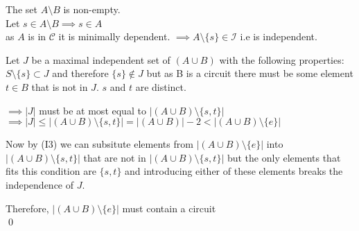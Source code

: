 \documentclass{article}
\theoremstyle{plain}
\theoremstyle{definition}
\theoremstyle{remark}
\begin{document}
\noindent The set $ A \setminus B $ is non-empty.\\
 Let $ s \in A \setminus B    \implies s \in A$\\
 \noindent as $A$ is in $\mathcal{C}$ it is minimally dependent.
 \noindent $\implies A \setminus \{s\} \in \mathcal{I}$ i.e is independent.
 
 \vspace{2mm}
 
\noindent Let $J$ be a maximal independent set of $(A \cup B)$ with the following properties: $S \setminus \{s\} \subset J $ and therefore $ \{s\} \notin J $ but as B is a circuit there must be some element $t \in B$ that is not in $J$. $s$ and $t$ are distinct.
 
 \vspace{2mm}
 
\noindent $\implies |J| $ must be at most equal to $|(A \cup B) \setminus \{s,t\}| $\\
 $\implies |J| \leq |(A \cup B) \setminus \{s,t\}| = |(A \cup B)| - 2 < |(A \cup B) \setminus \{e\}|$
 
 \vspace{2mm} 
 
 \noindent Now by (I3) we can subsitute elements from $|(A \cup B) \setminus \{e\}|$ into $|(A \cup B) \setminus \{s,t\}|$ that are not in $|(A \cup B) \setminus \{s,t\}|$ but the only elements that fits this condition are $\{s,t\}$ and introducing either of these elements breaks the independence of $J$.
 
\noindent Therefore, $|(A \cup B) \setminus \{e\}|$ must contain a circuit\\
 \qed
 
\end{document}
